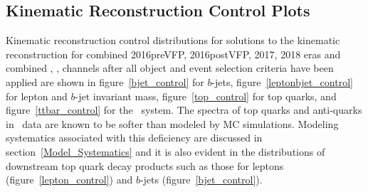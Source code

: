 \clearpage
\subsection{Kinematic Reconstruction Control Plots}
Kinematic reconstruction control distributions for solutions to the kinematic reconstruction for combined 2016preVFP, 2016postVFP, 2017, 2018 eras and combined \ee, \emu, \mumu channels after all object and event selection criteria have been applied are shown in figure~\ref{bjet_control} for $b$-jets, figure~\ref{leptonbjet_control} for lepton and $b$-jet invariant mass, figure~\ref{top_control} for top quarks, and figure~\ref{ttbar_control} for the \ttbar\ system.
The \pT spectra of top quarks and anti-quarks in \ttbar\ data are known to be softer than modeled by MC simulations.
Modeling systematics associated with this deficiency are discussed in section~\ref{Model_Systematics} and it is also evident in the \pT distributions of downstream top quark decay products such as those for leptons (figure~\ref{lepton_control}) and $b$-jets (figure~\ref{bjet_control}).


